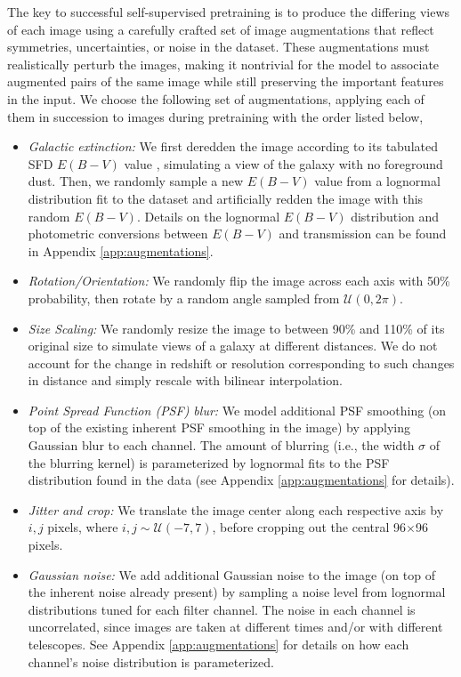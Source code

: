 \documentclass{aastex631}
\begin{document}
The key to successful self-supervised pretraining is to produce the differing views of each image using a carefully crafted set of image augmentations that reflect symmetries, uncertainties, or noise in the dataset. These augmentations must realistically perturb the images, making it nontrivial for the model to associate augmented pairs of the same image while still preserving the important features in the input. We choose the following set of augmentations, applying each of them in succession to images during pretraining with the order listed below,
\begin{itemize}

\item \textit{Galactic extinction:} We first deredden the image according to its tabulated SFD $E(B-V)$ value \citep{SFD1998Dust}, simulating a view of the galaxy with no foreground dust. Then, we randomly sample a new $E(B-V)$ value from a lognormal distribution fit to the dataset and artificially redden the image with this random $E(B - V)$. Details on the lognormal $E(B - V)$ distribution and photometric conversions between $E(B-V)$ and transmission can be found in Appendix \ref{app:augmentations}.

\item \textit{Rotation/Orientation:} We randomly flip the image across each axis with 50\% probability, then rotate by a random angle sampled from $\mathcal{U} (0, 2\pi)$.

\item \textit{Size Scaling:} We randomly resize the image to between 90\% and 110\% of its original size to simulate views of a galaxy at different distances. We do not account for the change in redshift or resolution corresponding to such changes in distance and simply rescale with bilinear interpolation.

\item \textit{Point Spread Function (PSF) blur:} We model additional PSF smoothing (on top of the existing inherent PSF smoothing in the image) by applying Gaussian blur to each channel. The amount of blurring (i.e., the width $\sigma$ of the blurring kernel) is parameterized by lognormal fits to the PSF distribution found in the data (see Appendix \ref{app:augmentations} for details).

\item \textit{Jitter and crop:} We translate the image center along each respective axis by $i,j$ pixels, where $i,j \sim \mathcal{U}(-7,7)$, before cropping out the central 96$\times$96 pixels.

\item \textit{Gaussian noise:} We add additional Gaussian noise to the image (on top of the inherent noise already present) by sampling a noise level from lognormal distributions tuned for each filter channel. The noise in each channel is uncorrelated, since images are taken at different times and/or with different telescopes. See Appendix \ref{app:augmentations} for details on how each channel's noise distribution is parameterized.

\end{itemize}
\end{document}
